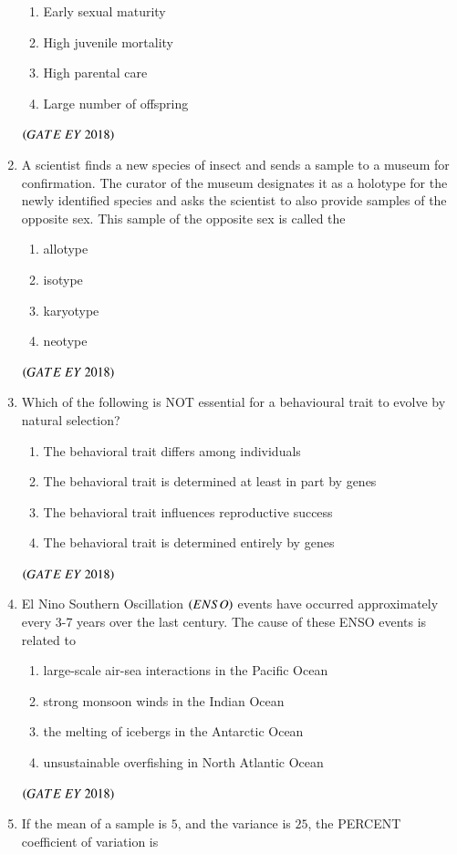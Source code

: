 \documentclass[journal]{IEEEtran}
\numberwithin{equation}{enumi}
\numberwithin{figure}{enumi}
\begin{document}
\begin{enumerate}
\begin{enumerate}
        \item Early sexual maturity
        \item High juvenile mortality
        \item High parental care
        \item Large number of offspring
    \end{enumerate}
    \hfill{$\brak{ GATE\ EY\ 2018}$}
    \bigskip
\item A scientist finds a new species of insect and sends a sample to a museum for
confirmation. The curator of the museum designates it as a holotype for the newly
identified species and asks the scientist to also provide samples of the opposite sex.
This sample of the opposite sex is called the
\begin{multicols}{4}
    \begin{enumerate}
        \item allotype
        \item isotype
        \item karyotype
        \item neotype
    \end{enumerate}
    \end{multicols}
    \hfill{$\brak{ GATE\ EY\ 2018}$}
    \bigskip
\item Which of the following is NOT essential for a behavioural trait to evolve by natural
selection?
    \begin{enumerate}
        \item The behavioral trait differs among individuals
        \item The behavioral trait is determined at least in part by genes
        \item The behavioral trait influences reproductive success
        \item The behavioral trait is determined entirely by genes
    \end{enumerate}
    \hfill{$\brak{ GATE\ EY\ 2018}$}
    \bigskip
\item El Nino Southern Oscillation $\left(ENSO\right)$ events have occurred approximately every
3-7 years over the last century. The cause of these ENSO events is related to
    \begin{enumerate}
        \item large-scale air-sea interactions in the Pacific Ocean
        \item strong monsoon winds in the Indian Ocean
        \item the melting of icebergs in the Antarctic Ocean
        \item unsustainable overfishing in North Atlantic Ocean
    \end{enumerate}
    \hfill{$\brak{ GATE\ EY\ 2018}$}
    \bigskip
\item If the mean of a sample is $5$, and the variance is $25$, the PERCENT coefficient of
variation is


\end{enumerate}
\end{document}

